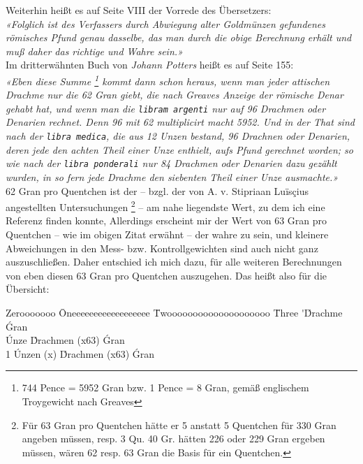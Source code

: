 \documentclass[a5paper,fontsize=10pt]{memoir}
\newcommand\ouncesofpound{12}
\newcommand\quentinsofounce{8}
\newcommand\gransofquentins{63}
\begin{document}
Weiterhin heißt es auf Seite VIII der Vorrede des Übersetzers:\\

\emph{«Folglich ist des Verfassers durch Abwiegung
alter Goldmünzen gefundenes römisches Pfund genau dasselbe,
das man durch die obige Berechnung erhält
und muß daher das richtige und Wahre sein.»}\\

Im dritterwähnten Buch von \emph{Johann Potters}
heißt es auf Seite 155:\\

\emph{«Eben diese Summe%
\footnote{744 Pence = 5952 Gran bzw. 1 Pence = 8 Gran,
gemäß englischem Troygewicht nach Greaves}
kommt dann schon heraus,
wenn man jeder attischen Drachme nur die 62 Gran giebt,
die nach Greaves Anzeige der römische Denar gehabt hat,
und wenn man die \texttt{libram argenti} nur auf 96 Drachmen
oder Denarien rechnet.
Denn 96 mit 62 multiplicirt macht 5952.
Und in der That sind nach der \texttt{libra medica},
die aus 12 Unzen bestand, 96 Drachnen oder Denarien,
deren jede den achten Theil einer Unze enthielt,
aufs Pfund gerechnet worden;
so wie nach der \texttt{libra ponderali} nur 84 Drachmen
oder Denarien dazu gezählt wurden,
in so fern jede Drachme den siebenten Theil einer Unze ausmachte.»}\\

62 Gran pro Quentchen ist der
-- bzgl. der von A. v. Stipriaan Luïsçius angestellten Untersuchungen%
\footnote{Für 63 Gran pro Quentchen
hätte er 5 anstatt 5 Quentchen
für 330 Gran angeben müssen,
resp. 3 Qu. 40 Gr. hätten 226 oder 229 Gran ergeben müssen,
wären 62 resp. 63 Gran die Basis für ein Quentchen.}%
-- am nahe liegendste Wert,
zu dem ich eine Referenz finden konnte,
Allerdings erscheint mir der Wert von 63 Gran pro Quentchen
-- wie im obigen Zitat erwähnt
-- der wahre zu sein,
und kleinere Abweichungen in den Mess- bzw. Kontrollgewichten
sind auch nicht ganz auszuschließen. Daher entschied ich mich dazu,
für alle weiteren Berechnungen 
von eben diesen 63 Gran pro Quentchen auszugehen. 
Das heißt also für die Übersicht:\\

\noindent
\begin{minipage}{\linewidth}
\begin{tabbing}
Zerooooooo \= Oneeeeeeeeeeeeeeeeee \= Twoooooooooooooooooooo \= Three      \kill
           \>  \'                  \'Drachme             \>  \gransofquentins\'Gran \\
           \'Unze              \> \quentinsofounce\'Drachmen (x\gransofquentins)      \> \fpeval{\quentinsofounce * \gransofquentins}\'Gran \\
1 \Pfund   \>\ouncesofpound\'Unzen (x\fpeval{\quentinsofounce * \gransofquentins})      \>\fpeval{\ouncesofpound * \quentinsofounce}\'Drachmen (x\gransofquentins)      \>\fpeval{\ouncesofpound * \quentinsofounce * \gransofquentins}\'Gran \\
\end{tabbing}
\end{minipage}
\end{document}
